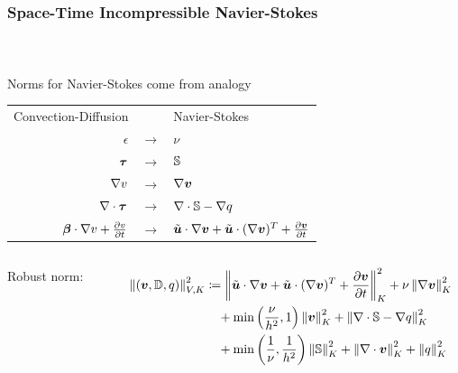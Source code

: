 \documentclass[18pt,xcolor=table]{beamer}
\begin{document}
\begin{frame}[t]
\frametitle{Space-Time Incompressible Navier-Stokes}
\framesubtitle{~}
\vspace{-2ex}
\begin{block}{Norms for Navier-Stokes come from analogy}
\centering
\begin{tabular}{rcl}
Convection-Diffusion & & Navier-Stokes\\
$\epsilon$ &$\rightarrow$& $\nu$ \\
$\boldsymbol\tau$ &$\rightarrow$& $\mathbb{S}$ \\
$\nabla v$ &$\rightarrow$& $\nabla\boldsymbol v$ \\
$\nabla\cdot\boldsymbol\tau$ &$\rightarrow$& $\nabla\cdot\mathbb{S}-\nabla q$ \\
$\boldsymbol\beta\cdot\nabla v+\frac{\partial v}{\partial t}$ &$\rightarrow$& $\tilde{\boldsymbol u}\cdot\nabla\boldsymbol v+\tilde{\boldsymbol u}\cdot(\nabla\boldsymbol v)^T+\frac{\partial\boldsymbol v}{\partial t}$
\end{tabular}
\end{block}
\vspace{-1ex}
\begin{columns}
\begin{column}{0.2\textwidth}
Robust norm: 
\end{column}
\begin{column}{0.8\textwidth}
\begin{align*}
\left\| \left( \boldsymbol v,\mathbb{D},q \right) \right\|_{V,K}^2 &\coloneqq
\left\| \tilde{\boldsymbol u}\cdot\nabla\boldsymbol v +\tilde{\boldsymbol u}\cdot(\nabla\boldsymbol v)^T+\frac{\partial\boldsymbol v}{\partial t} \right\|_K^2
+ \nu\left\| \nabla\boldsymbol v \right\|_K^2
\\&\quad
+ \min\left( \frac{\nu}{h^2},1 \right)\left\| \boldsymbol v \right\|^2_K
+ \left\| \nabla\cdot\mathbb{S}-\nabla q \right\|_K^2
\\\nonumber&\quad
+ \min\left( \frac{1}{\nu},\frac{1}{h^2} \right)\left\| \mathbb{S} \right\|_K^2
+\left\| \nabla\cdot\boldsymbol v \right\|_K^2
+\left\| q \right\|_K^2
\end{align*}
\end{column}
\end{columns}
\end{frame}
\end{document}
